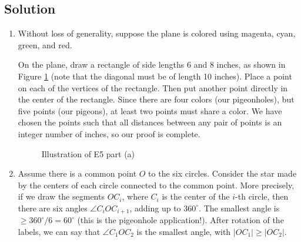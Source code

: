 \documentclass{article}
\begin{document}
\subsection*{Solution}
    \begin{enumerate}
        \item Without loss of generality, suppose the plane is colored using magenta, cyan, green, and red.
        
        \vspace{1mm}
        On the plane, draw a rectangle of side lengths 6 and 8 inches, as shown in Figure \ref{fig:E5a} (note that the diagonal must be of length 10 inches). Place a point on each of the vertices of the rectangle. Then put another point directly in the center of the rectangle. Since there are four colors (our pigeonholes), but five points (our pigeons), at least two points must share a color. We have chosen the points such that all distances between any pair of points is an integer number of inches, so our proof is complete.
        \begin{figure}[htbp]
        \centering
        \caption{Illustration of E5 part (a)}
        \label{fig:E5a}
        \end{figure}
        \item Assume there is a common point $O$ to the six circles. Consider the star made by the centers of each circle connected to the common point. More precisely, if we draw the segments $OC_i$, where $C_{i}$ is the center of the $i$-th circle, then there are six angles $\angle C_iOC_{i+1}$, adding up to $360^{\circ}$. The smallest angle is $\ge 360^{\circ} / 6 = 60^{\circ}$ (this is the pigeonhole application!). After rotation of the labels, we can say that $\angle C_1OC_{2}$ is the smallest angle, with $|OC_1| \ge |OC_2|$.
        

\end{enumerate}
\end{document}

